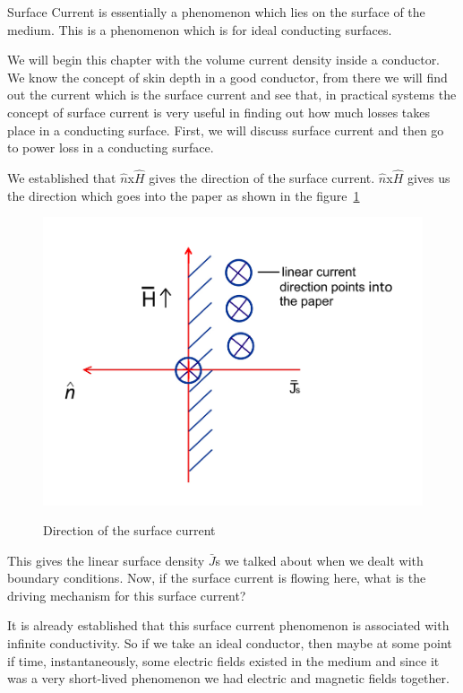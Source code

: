 Surface Current is essentially a phenomenon which lies on the surface of the medium. This is a phenomenon which is for ideal conducting surfaces.

We will begin this chapter with the volume current density inside a conductor. We know the concept of skin depth in a good conductor, from there we will find out the current which is the surface current and see that, in practical systems the concept of surface current is very useful in finding out how much losses takes place in a conducting surface. First, we will discuss surface current and then go to power loss in a conducting surface.

We established that $\hat{n}$x$\hat{H}$ gives the direction of the surface current. $\hat{n}$x$\hat{H}$ gives us the direction which goes into the paper as shown in the figure~\ref{fig:direction_of_surface_current}
\begin{figure}[h]
\centering
\textsc{\includegraphics[width=1\linewidth]{graphics/surface_current_direction}}
\caption{Direction of the surface current}
\label{fig:direction_of_surface_current}
\end{figure}

This gives the linear surface density $\bar{J}$s we talked about when we dealt with boundary conditions. Now, if the surface current is flowing here, what is the driving mechanism for this surface current?

It is already established that this surface current phenomenon is associated with infinite conductivity. So if we take an ideal conductor, then maybe at some point if time, instantaneously, some electric fields existed in the medium and since it was a very short-lived phenomenon we had electric and magnetic fields together.

